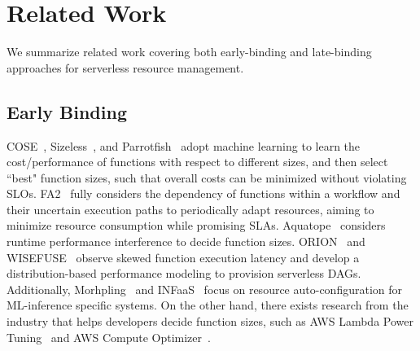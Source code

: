 \section{Related Work}
\label{sec:relatedwork}

We summarize related work covering both early-binding and late-binding approaches for serverless resource management.

         

\subsection{Early Binding}
COSE~\cite{infocom20-cose}, Sizeless~\cite{middleware21-sizeless}, and Parrotfish~\cite{socc23-parrotfish} adopt machine learning to learn the cost/performance of functions with respect to different sizes, and then select ``best" function sizes, such that overall costs can be minimized without violating SLOs.
FA2~\cite{rtas22-fa2} fully considers the dependency of functions within a workflow and their uncertain execution paths to periodically adapt resources, aiming to minimize resource consumption while promising SLAs.
Aquatope~\cite{asplos23-aquatope} considers runtime performance interference to decide function sizes.
ORION~\cite{osdi22-orion} and WISEFUSE~\cite{mac22-wisefuse} observe skewed function execution latency and develop a distribution-based performance modeling to provision serverless DAGs.
Additionally, Morhpling~\cite{socc21-morphling} and INFaaS~\cite{socc21-llama} focus on resource auto-configuration for ML-inference specific systems.
On the other hand, there exists research from the industry that helps developers decide function sizes, such as AWS Lambda Power Tuning~\cite{lambda-tuning} and AWS Compute Optimizer~\cite{lambda-compute-optimizer}.

